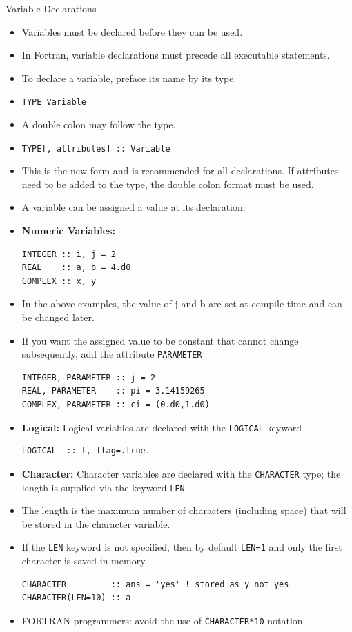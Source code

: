 \documentclass[c,mathserif,compress,xcolor=svgnames]{beamer}
\newcommand{\lstfortran}[1]{\lstinline[language={[90]Fortran},basicstyle=\footnotesize\ttfamily]|#1|}
\begin{document}
\begin{frame}{Variable Declarations}
  \begin{itemize}
    \item Variables must be declared before they can be used.
    \item In Fortran, variable declarations must precede all executable statements.
    \item To declare a variable, preface its name by its type.
    \item[] \lstfortran{TYPE Variable}
    \item A double colon may follow the type.
    \item[] \lstfortran{TYPE[, attributes] :: Variable}
    \item This is the new form and is recommended for all declarations. If attributes need to be added to the type, the double colon format must be used.
    \item A variable can be assigned a value at its declaration.
    \framebreak
    \item \textbf{Numeric Variables:}
      \begin{lstlisting}[language={[90]Fortran}]
INTEGER :: i, j = 2
REAL    :: a, b = 4.d0
COMPLEX :: x, y 
      \end{lstlisting}
    \item In the above examples, the value of j and b are set at compile time and can be changed later.
    \item If you want the assigned value to be constant that cannot change subsequently, add the attribute \lstfortran{PARAMETER}
      \begin{lstlisting}[language={[90]Fortran}]
INTEGER, PARAMETER :: j = 2
REAL, PARAMETER    :: pi = 3.14159265
COMPLEX, PARAMETER :: ci = (0.d0,1.d0)
      \end{lstlisting}
    \item \textbf{Logical:} Logical variables are declared with the \lstfortran{LOGICAL} keyword
      \begin{lstlisting}[language={[90]Fortran}]
LOGICAL  :: l, flag=.true.
      \end{lstlisting}
    \item \textbf{Character:} Character variables are declared with the \lstfortran{CHARACTER} type; the length is supplied via the keyword \lstfortran{LEN}.
    \item The length is the maximum number of characters (including space) that will be stored in the character variable.
    \item If the \lstfortran{LEN} keyword is not specified, then by default \lstfortran{LEN=1} and only the first character is saved in memory. 
      \begin{lstlisting}[language={[90]Fortran}]
CHARACTER         :: ans = 'yes' ! stored as y not yes
CHARACTER(LEN=10) :: a
      \end{lstlisting}
    \item FORTRAN programmers: avoid the use of \lstfortran{CHARACTER*10} notation.
  \end{itemize}
\end{frame}
\end{document}
